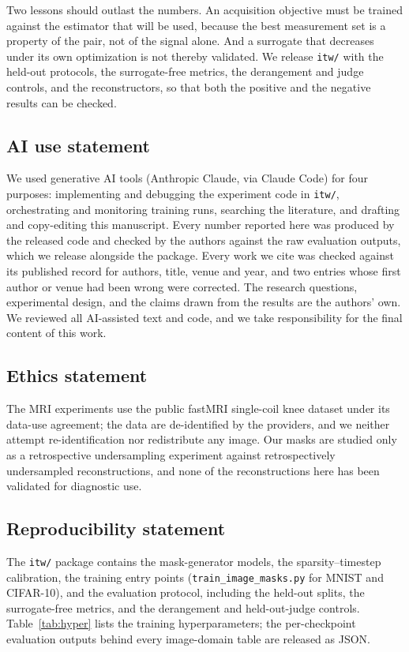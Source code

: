 \documentclass{article}
\begin{document}
Two lessons should outlast the numbers. An acquisition objective must be trained against the estimator that will be used, because the best measurement set is a property of the pair, not of the signal alone. And a surrogate that decreases under its own optimization is not thereby validated. We release \texttt{itw/} with the held-out protocols, the surrogate-free metrics, the derangement and judge controls, and the reconstructors, so that both the positive and the negative results can be checked.

\subsection*{AI use statement}

We used generative AI tools (Anthropic Claude, via Claude Code) for four
purposes: implementing and debugging the experiment code in \texttt{itw/},
orchestrating and monitoring training runs, searching the literature, and
drafting and copy-editing this manuscript. Every number reported here was
produced by the released code and checked by the authors against the raw
evaluation outputs, which we release alongside the package. Every work we cite
was checked against its published record for authors, title, venue and year,
and two entries whose first author or venue had been wrong were corrected. The
research questions, experimental design, and the claims drawn from the results
are the authors' own. We reviewed all AI-assisted text and code, and we take
responsibility for the final content of this work.

\subsection*{Ethics statement}

The MRI experiments use the public fastMRI single-coil knee dataset
\citep{zbontar2018fastmri} under its data-use agreement; the data are
de-identified by the providers, and we neither attempt re-identification nor
redistribute any image. Our masks are studied only as a retrospective
undersampling experiment against retrospectively undersampled reconstructions,
and none of the reconstructions here has been validated for diagnostic use.

\subsection*{Reproducibility statement}

The \texttt{itw/} package contains the mask-generator models, the
sparsity--timestep calibration, the training entry points
(\texttt{train\_image\_masks.py} for MNIST and CIFAR-10), and the evaluation
protocol, including the held-out splits, the surrogate-free metrics, and the
derangement and held-out-judge controls. Table~\ref{tab:hyper} lists the
training hyperparameters; the per-checkpoint evaluation outputs behind every
image-domain table are released as JSON.
\end{document}
